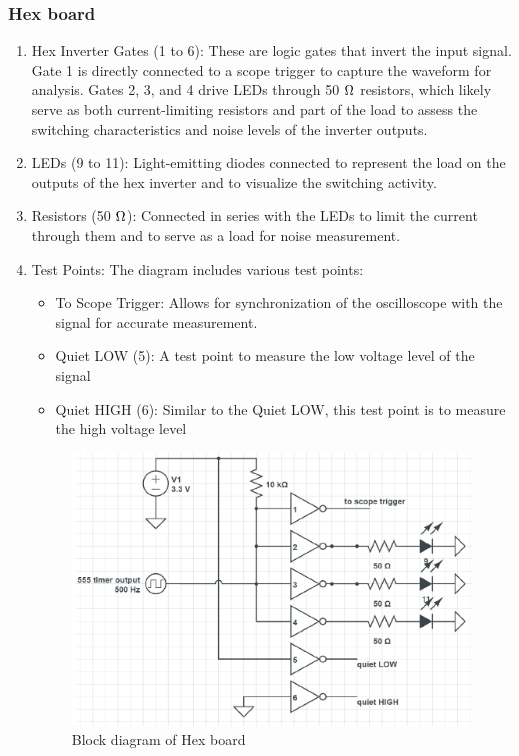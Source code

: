 \documentclass[a4paper,11pt]{article}%
\begin{document}
\subsubsection{Hex board}
\begin{enumerate}
	\item Hex Inverter Gates (1 to 6): These are logic gates that invert the input signal. Gate 1 is directly connected to a scope trigger to capture the waveform for analysis. Gates 2, 3, and 4 drive LEDs through 50 $\ohm$ resistors, which likely serve as both current-limiting resistors and part of the load to assess the switching characteristics and noise levels of the inverter outputs.
	\item LEDs (9 to 11): Light-emitting diodes connected to represent the load on the outputs of the hex inverter and to visualize the switching activity.
	\item Resistors (50 $\ohm$): Connected in series with the LEDs to limit the current through them and to serve as a load for noise measurement.
	\item Test Points: The diagram includes various test points:
	\begin{itemize}
		\item To Scope Trigger: Allows for synchronization of the oscilloscope with the signal for accurate measurement.
		\item Quiet LOW (5): A test point to measure the low voltage level of the signal 
		\item Quiet HIGH (6): Similar to the Quiet LOW, this test point is to measure the high voltage level
	\end{itemize}
	
	
	\begin{figure}[H]
		\centering
		\includegraphics[scale=0.4]{figures/signal_noise.png}
		\caption{Block diagram of Hex board}
	\end{figure}
	

\end{enumerate}
\end{document}
